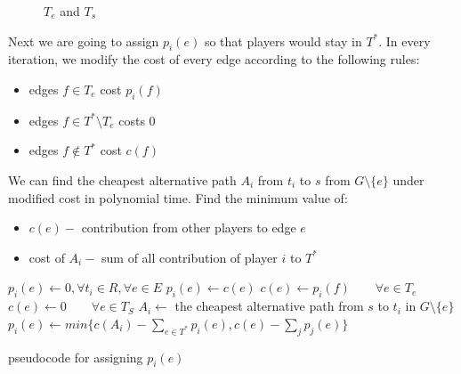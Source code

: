 \documentclass[11pt,psfig,times]{article}
\begin{document}
\begin{figure}
	\begin{center}
	\end{center}
	\caption{$T_e$ and $T_s$}
\end{figure}


Next we are going to assign \(p_i(e)\) so that players would stay in \(T^*\). In every iteration, we modify the cost of every edge according to the following rules:
\begin{itemize}
	\item edges \(f \in T_e\) cost \(p_i(f)\)
	\item edges \(f \in T^*\setminus T_e\) costs 0
	\item edges \(f\notin T^*\) cost \(c(f)\)
\end{itemize}
We can find the cheapest alternative path \(A_i\) from \(t_i\) to \(s\) from \(G \setminus \{e\}\) under modified cost in polynomial time. 
		Find the minimum value of:
		\begin{itemize}
			\item $c(e) - $ contribution from other players to edge \(e\)
			\item cost of \(A_i-\) sum of all contribution of player \(i\) to \(T^*\) 
		\end{itemize}
\begin{algorithm}[H]
	\begin{algorithmic}[1]
		\STATE $p_i(e) \gets 0, \forall t_i \in R, \forall e \in E$ 
		\STATE $p_i(e) \gets c(e)$
		\ELSE
		\STATE \(c(e) \gets p_i(f)  \qquad \forall e \in T_e\) 
		\STATE \(c(e) \gets 0 \qquad \forall e \in T_S\) 
		\STATE $A_i \gets$ the cheapest alternative path from \(s\) to \(t_i\) in $G\setminus\{e\}$ 
		\STATE \(p_i(e) \gets min\{c(A_i) - \sum_{e\in T^*}p_i(e), c(e)-\sum_{j}p_j(e) \}\)
		\ENDIF
		\ENDWHILE
	\end{algorithmic}
	\caption{pseudocode for assigning $p_i(e)$ }
	\label{alg:seq}
	\end{algorithm}
	
\end{document}
